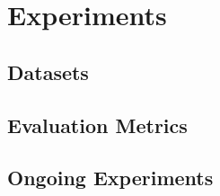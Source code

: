 \FloatBarrier
\section{Experiments}
    \subsection{Datasets}

    \subsection{Evaluation Metrics}
    
    \subsection{Ongoing Experiments}

